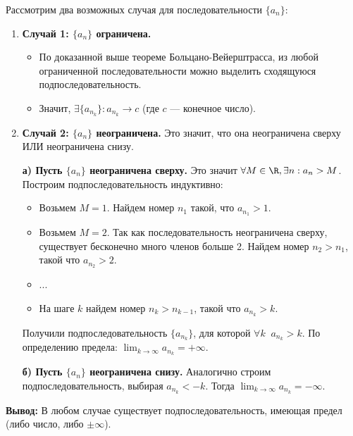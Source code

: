 \begin{tcolorbox}[title=Доказательство]
	Рассмотрим два возможных случая для последовательности $\{a_n\}$:
	
	\begin{enumerate}
		\item \textbf{Случай 1: $\{a_n\}$ ограничена.}
			\begin{itemize}
				\item По доказанной выше теореме Больцано-Вейерштрасса, из любой ограниченной последовательности можно выделить сходящуюся подпоследовательность.
				\item Значит, $\exists \{a_{n_k}\}: a_{n_k} \to c$ (где $c$ — конечное число).
			\end{itemize}
			
		\item \textbf{Случай 2: $\{a_n\}$ неограничена.}
			Это значит, что она неограничена сверху ИЛИ неограничена снизу.
			
			\textbf{а) Пусть $\{a_n\}$ неограничена сверху.}
			Это значит $\forall M \in \R, \exists n: a_n > M$. Построим подпоследовательность индуктивно:
			\begin{itemize}
				\item Возьмем $M=1$. Найдем номер $n_1$ такой, что $a_{n_1} > 1$.
				\item Возьмем $M=2$. Так как последовательность неограничена сверху, существует бесконечно много членов больше 2. Найдем номер $n_2 > n_1$, такой что $a_{n_2} > 2$.
				\item ...
				\item На шаге $k$ найдем номер $n_k > n_{k-1}$, такой что $a_{n_k} > k$.
			\end{itemize}
			Получили подпоследовательность $\{a_{n_k}\}$, для которой $\forall k \;\; a_{n_k} > k$.
			По определению предела: $\lim_{k\to\infty} a_{n_k} = +\infty$.
			
			\textbf{б) Пусть $\{a_n\}$ неограничена снизу.}
			Аналогично строим подпоследовательность, выбирая $a_{n_k} < -k$.
			Тогда $\lim_{k\to\infty} a_{n_k} = -\infty$.
	\end{enumerate}
	
	\textbf{Вывод:} В любом случае существует подпоследовательность, имеющая предел (либо число, либо $\pm \infty$).
\end{tcolorbox}
